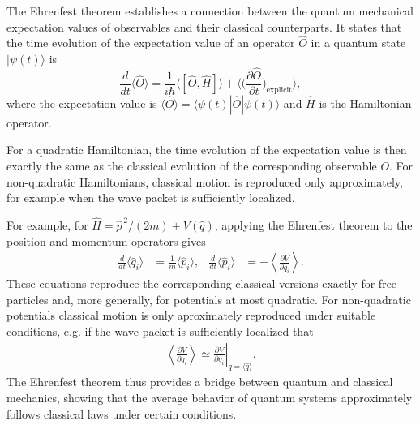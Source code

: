 \documentclass[../QFT_main.tex]{subfiles}
\begin{document}
\begin{mytheorem}
The Ehrenfest theorem establishes a connection between the quantum mechanical expectation values of observables and their classical counterparts.
It states that the time evolution of the expectation value
of an operator \(\hat O\) in a quantum state \(|\psi(t)\rangle\) is
{\small\begin{equation}
    \frac{d}{dt} \langle \hat{O} \rangle = \frac{1}{i\hbar} \langle [\hat{O}, \hat{H}] \rangle + \Big\langle \Big(\frac{\partial \hat{O}}{\partial t}\Big)_{\text{explicit}} \Big\rangle,
\end{equation}}
where the expectation value  is \(\langle \hat{O} \rangle = \langle \psi(t) | \hat{O} | \psi(t) \rangle\) and \(\hat{H}\) is the Hamiltonian operator.

For a quadratic Hamiltonian, the time evolution of the expectation value is then exactly the same as the classical evolution of the corresponding observable \(O\).
For non-quadratic Hamiltonians, classical motion is reproduced only approximately, for example when the wave packet is sufficiently localized.

For example, for \(\hat H=\hat p^{\,2}/(2m)+V(\hat q)\), applying the Ehrenfest theorem to the position and momentum operators gives
{\small\begin{align}
    \frac{d}{dt}\langle\hat q_i\rangle
    &=
    \frac{1}{m}\langle\hat p_i\rangle,
    &
    \frac{d}{dt}\langle\hat p_i\rangle
    &=
    -\left\langle\frac{\partial V}{\partial q_i}\right\rangle.
\end{align}}
These equations reproduce the corresponding classical versions exactly
for free particles and, more generally, for potentials at most
quadratic.
For non-quadratic potentials classical motion is only aproximately reproduced under suitable conditions, e.g. if the wave packet is sufficiently
localized that
{\small\begin{align}
    \left\langle\frac{\partial V}{\partial q_i}\right\rangle
    \simeq
    \left.
    \frac{\partial V}{\partial q_i}
    \right|_{q=\langle\hat q\rangle}.
\end{align}}
The Ehrenfest theorem thus provides a bridge between quantum and classical mechanics, showing that the average behavior of quantum systems approximately follows classical laws under certain conditions.
\end{mytheorem}
\end{document}
